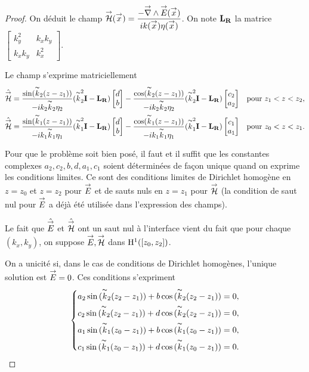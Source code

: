 \begin{proof}
      On déduit le champ \(\vH(\vx) = \frac{-\vrot{\vE}(\vx)}{i k(\vx)\eta(\vx)}\). On note \(\mLR\) la matrice \(
      \begin{bmatrix}
          k_y^2 & k_xk_y
          \\
          k_xk_y & k_x^2
      \end{bmatrix}
      \).


      Le champ s'exprime matriciellement
      \begin{align*}
        \hat{\vH} &= \frac{\sin(\kk_2(z-z_1))}{-i k_2\kk_2 \eta_2}(\kk_2^2 \mI - \mLR)\begin{bmatrix}d \\ b\end{bmatrix} - \frac{\cos(\kk_2(z-z_1))}{-i k_2\kk_2 \eta_2}(\kk_2^2 \mI - \mLR)\begin{bmatrix}c_2 \\ a_2\end{bmatrix} && \text{pour } z_1 < z < z_2,
        \\
        \hat{\vH} &= \frac{\sin(\kk_1(z-z_1))}{-i k_1\kk_1 \eta_1}(\kk_1^2 \mI - \mLR)\begin{bmatrix}d \\ b\end{bmatrix} - \frac{\cos(\kk_1(z-z_1))}{-i k_1\kk_1 \eta_1}(\kk_1^2 \mI - \mLR)\begin{bmatrix}c_1 \\ a_1\end{bmatrix} && \text{pour } z_0 < z < z_1.
      \end{align*}

      Pour que le problème soit bien posé, il faut et il suffit que les constantes complexes \(a_2,c_2,b,d,a_1,c_1\) soient déterminées de façon unique quand on exprime les conditions limites. Ce sont des conditions limites de Dirichlet homogène en \(z=z_0\) et \(z=z_2\) pour \(\vE\) et de sauts nuls en \(z=z_1\) pour \(\vH\) (la condition de saut nul pour \(\vE\) a déjà été utilisée dans l'expression des champs).
      \begin{REM}
        Le fait que \(\hat{\vE}\) et \(\hat{\vH}\) ont un saut nul à l'interface vient du fait que pour chaque \((k_x,k_y)\), on suppose \(\vE,\vH\) dans \(\Sobup[1]{([z_0,z_2])}\).
      \end{REM}
      On a unicité si, dans le cas de conditions de Dirichlet homogènes, l'unique solution est \(\vE=0\). Ces conditions s'expriment
      \begin{equation*}
        \label{eq:unicite:interieur:2couches:cldirichlet}
        \left\lbrace
        \begin{aligned}
          a_2\sin{(\kk_2(z_2-z_1))} + b\cos{(\kk_2(z_2-z_1))} &= 0,
          \\
          c_2\sin{(\kk_2(z_2-z_1))} + d\cos{(\kk_2(z_2-z_1))} &= 0,
          \\
          a_1\sin{(\kk_1(z_0-z_1))} + b\cos{(\kk_1(z_0-z_1))} &= 0,
          \\
          c_1\sin{(\kk_1(z_0-z_1))} + d\cos{(\kk_1(z_0-z_1))} &= 0.
        \end{aligned}
        \right.
      \end{equation*}


\end{proof}
